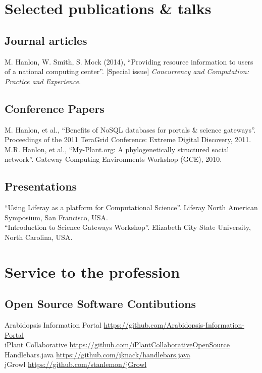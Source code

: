\documentclass[10pt, a4paper]{article}
\newcommand{\years}[1]{\marginnote{\scriptsize #1}}
\begin{document}
\section*{Selected publications \& talks}

\subsection*{Journal articles}
\noindent
\years{2014}M. Hanlon, W. Smith, S. Mock (2014), ``Providing resource information to users of a national computing center''. [Special issue] \emph{Concurrency and Computation: Practice and Experience}.

\subsection*{Conference Papers}
\noindent
\years{2011}M. Hanlon, et al., ``Benefits of NoSQL databases for portals \& science gateways''. Proceedings of the 2011 TeraGrid Conference: Extreme Digital Discovery, 2011.\\
\years{2010}M.R. Hanlon, et al., ``My-Plant.org: A phylogenetically structured social network''. Gateway Computing Environments Workshop (GCE), 2010.\\

\subsection*{Presentations}
\noindent
\years{2013}``Using Liferay as a platform for Computational 
Science''. Liferay North American Symposium, San Francisco, USA.\\
\years{2013}``Introduction to Science Gateways Workshop''. Elizabeth City State University, North Carolina, USA.

%

\section*{Service to the profession}

\subsection*{Open Source Software Contibutions}
Arabidopsis Information Portal \href{https://github.com/Arabidopsis-Information-Portal}{https://github.com/Arabidopsis-Information-Portal}\\
iPlant Collaborative \href{https://github.com/iPlantCollaborativeOpenSource}{https://github.com/iPlantCollaborativeOpenSource}\\
Handlebars.java \href{https://github.com/jknack/handlebars.java}{https://github.com/jknack/handlebars.java}\\
jGrowl \href{https://github.com/stanlemon/jGrowl}{https://github.com/stanlemon/jGrowl}
\end{document}
